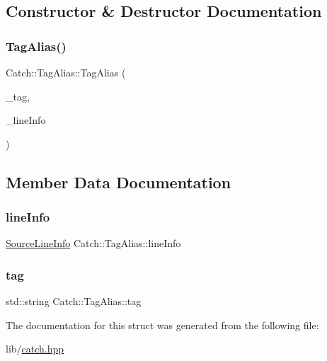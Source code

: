 \subsection{Constructor \& Destructor Documentation}
\hypertarget{struct_catch_1_1_tag_alias_ad9124d03bfb6f767f1c97572330b05bc}{}\label{struct_catch_1_1_tag_alias_ad9124d03bfb6f767f1c97572330b05bc} 
\subsubsection{\texorpdfstring{Tag\+Alias()}{TagAlias()}}
{\footnotesize\ttfamily Catch\+::\+Tag\+Alias\+::\+Tag\+Alias (\begin{DoxyParamCaption}\item[{std\+::string}]{\+\_\+tag,  }\item[{\hyperlink{struct_catch_1_1_source_line_info}{Source\+Line\+Info}}]{\+\_\+line\+Info }\end{DoxyParamCaption})\hspace{0.3cm}{\ttfamily [inline]}}



\subsection{Member Data Documentation}
\hypertarget{struct_catch_1_1_tag_alias_a2f51fe0b3c052561275d26b6eb88f702}{}\label{struct_catch_1_1_tag_alias_a2f51fe0b3c052561275d26b6eb88f702} 
\subsubsection{\texorpdfstring{line\+Info}{lineInfo}}
{\footnotesize\ttfamily \hyperlink{struct_catch_1_1_source_line_info}{Source\+Line\+Info} Catch\+::\+Tag\+Alias\+::line\+Info}

\hypertarget{struct_catch_1_1_tag_alias_a950183883ab17c90d0fab16b966b6e2d}{}\label{struct_catch_1_1_tag_alias_a950183883ab17c90d0fab16b966b6e2d} 
\subsubsection{\texorpdfstring{tag}{tag}}
{\footnotesize\ttfamily std\+::string Catch\+::\+Tag\+Alias\+::tag}



The documentation for this struct was generated from the following file\+:\begin{DoxyCompactItemize}
\item 
lib/\hyperlink{catch_8hpp}{catch.\+hpp}\end{DoxyCompactItemize}

